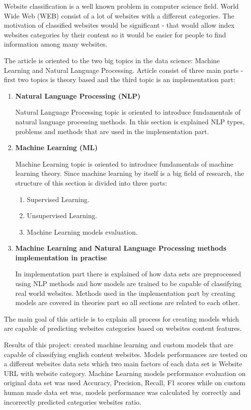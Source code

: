 

Website classification is a well known problem in computer science field. World Wide Web (WEB) consist of a lot of websites with a different categories. The motivation of classified websites would be significant - that would allow index websites categories by their content so it would be easier for people to find information among many websites.


The article is oriented to the two big topics in the data science: Machine Learning and Natural Language Processing. Article consist of three main parts - first two topics is theory based and the third topic is an implementation part:

\begin{enumerate}
    \item \textbf{Natural Language Processing (NLP)}
    
    Natural Language Processing topic is oriented to introduce fundamentals of natural language processing methods. In this section is explained NLP types, problems and methods that are used in the implementation part.
    
    \item \textbf{Machine Learning (ML)}
    
    Machine Learning topic is oriented to introduce fundamentals of machine learning theory. Since machine learning by itself is a big field of research, the structure of this section is divided into three parts:
    \begin{enumerate}
        \item Supervised Learning.
        \item Unsupervised Learning.
        \item Machine Learning models evaluation.
    \end{enumerate}
    
    \item \textbf{Machine Learning and Natural Language Processing methods implementation in practise}
    
    In implementation part there is explained of how data sets are preprocessed using NLP methods and how models are trained to be capable of classifying real world websites. Methods used in the implementation part by creating models are covered in theories part so all sections are related to each other.
\end{enumerate}

The main goal of this article is to explain all process for creating models which are capable of predicting websites categories based on websites content features.


Results of this project: created machine learning and custom models that are capable of classifying english content websites. Models performances are tested on a different websites data sets which two main factors of each data set is Website URL with website category. Machine Learning models performance evaluation on original data set was used Accuracy, Precision, Recall, F1 scores while on custom human made data set was, models performance was calculated by correctly and incorrectly predicted categories websites ratio.

